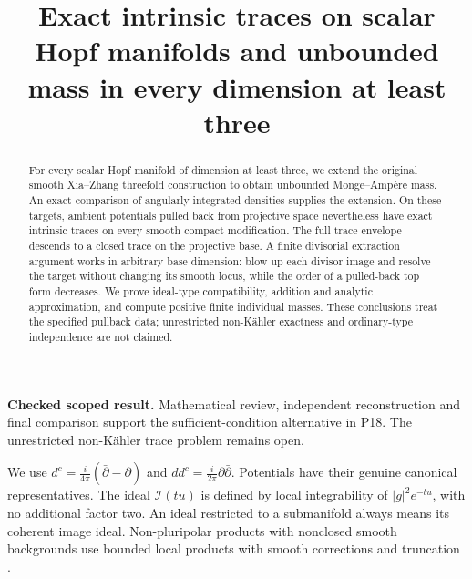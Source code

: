 \documentclass[11pt]{article}
\title{Exact intrinsic traces on scalar Hopf manifolds\newline
and unbounded mass in every dimension at least three}
\author{}
\date{}
\newcommand{\ddc}{dd^c}
\newcommand{\I}{\mathcal I}
\theoremstyle{remark}\newtheorem{remark}[theorem]{Remark}
\begin{document}
\maketitle
\noindent\textbf{Checked scoped result.} Mathematical review, independent
reconstruction and final comparison support the sufficient-condition
alternative in P18. The unrestricted non-K\"ahler trace problem remains open.
\begin{abstract}
For every scalar Hopf manifold of dimension at least three, we extend
the original smooth Xia--Zhang threefold construction to obtain
unbounded Monge--Amp\`ere mass. An exact comparison of angularly
integrated densities supplies the extension. On these targets, ambient
potentials pulled back from projective space nevertheless have exact
intrinsic traces on every smooth compact modification. The full trace
envelope descends to a closed trace on the projective base. A finite
divisorial extraction argument works in arbitrary base dimension:
blow up each divisor image and resolve the target without changing its
smooth locus, while the order of a pulled-back top form decreases.
We prove ideal-type compatibility, addition and analytic approximation,
and compute positive finite individual masses. These conclusions treat
the specified pullback data; unrestricted non-K\"ahler exactness and
ordinary-type independence are not claimed.
\end{abstract}

We use $d^c=\frac{i}{4\pi}(\bar\partial-\partial)$ and
$\ddc=\frac{i}{2\pi}\partial\bar\partial$.
Potentials have their genuine canonical representatives.
The ideal $\I(tu)$ is defined by local integrability of
$|g|^2e^{-tu}$, with no additional factor two.
An ideal restricted to a submanifold always means its coherent image
ideal. Non-pluripolar products with nonclosed smooth backgrounds use
bounded local products with smooth corrections and truncation
\cite[Section 2.1]{BGL}.
\end{document}
